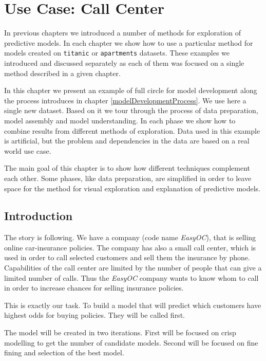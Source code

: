 \documentclass[12pt,]{krantz}
\begin{document}
\hypertarget{ccUseCase}{%
\section{Use Case: Call Center}\label{ccUseCase}}

In previous chapters we introduced a number of methods for exploration of predictive models. In each chapter we show how to use a particular method for models created on \texttt{titanic} or \texttt{apartments} datasets. These examples we introduced and discussed separately as each of them was focused on a single method described in a given chapter.

In this chapter we present an example of full circle for model development along the process introduces in chapter \ref{modelDevelopmentProcess}. We use here a single new dataset. Based on it we tour through the process of data preparation, model assembly and model understanding. In each phase we show how to combine results from different methods of exploration.
Data used in this example is artificial, but the problem and dependencies in the data are based on a real world use case.

The main goal of this chapter is to show how different techniques complement each other. Some phases, like data preparation, are simplified in order to leave space for the method for visual exploration and explanation of predictive models.

\hypertarget{introduction-3}{%
\subsection{Introduction}\label{introduction-3}}

The story is following. We have a company (code name \emph{EasyOC}), that is selling online car-insurance policies. The company has also a small call center, which is used in order to call selected customers and sell them the insurance by phone.
Capabilities of the call center are limited by the number of people that can give a limited number of calls. Thus the \emph{EasyOC} company wants to know whom to call in order to increase chances for selling insurance policies.

This is exactly our task. To build a model that will predict which customers have highest odds for buying policies. They will be called first.

The model will be created in two iterations. First will be focused on crisp modelling to get the number of candidate models. Second will be focused on fine fining and selection of the best model.
\end{document}
